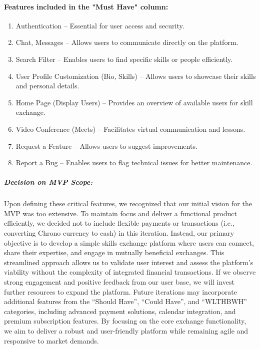 \paragraph{Features included in the "Must Have" column:}
\begin{enumerate}
    \item Authentication – Essential for user access and security.
    \item Chat, Messages – Allows users to communicate directly on the platform.
    \item Search Filter – Enables users to find specific skills or people efficiently.
    \item User Profile Customization (Bio, Skills) – Allows users to showcase their skills and personal details.
    \item Home Page (Display Users) – Provides an overview of available users for skill exchange.
    \item Video Conference (Meets) – Facilitates virtual communication and lessons.
    \item Request a Feature – Allows users to suggest improvements.
    \item Report a Bug – Enables users to flag technical issues for better maintenance.
\end{enumerate}

\subparagraph{Decision on MVP Scope:}
Upon defining these critical features, we recognized that our initial vision for the MVP was too extensive.
To maintain focus and deliver a functional product efficiently, we decided not to include flexible payments or transactions (i.e., converting Chrono currency to cash) in this iteration.
Instead, our primary objective is to develop a simple skills exchange platform where users can connect, share their expertise, and engage in mutually beneficial exchanges.
This streamlined approach allows us to validate user interest and assess the platform's viability without the complexity of integrated financial transactions.
If we observe strong engagement and positive feedback from our user base, we will invest further resources to expand the platform.
Future iterations may incorporate additional features from the ``Should Have'', ``Could Have'', and ``WLTHBWH'' categories, including advanced payment solutions, calendar integration, and premium subscription features.
By focusing on the core exchange functionality, we aim to deliver a robust and user-friendly platform while remaining agile and responsive to market demands.
\clearpage

